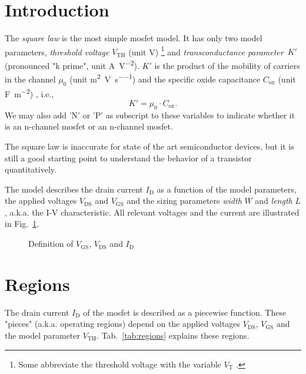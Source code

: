 \documentclass{article}[11pt]
\begin{document}
\notetitle

\section{Introduction}

The \textit{square law} is the most simple \gls{mosfet} model.
It has only two model parameters,
\textit{threshold voltage} $V_{\mathrm{TH}}$ (unit \si{\volt})%
\footnote{Some abbreviate the threshold voltage with 
the variable $V_{\mathrm{T}}$ \cite{allen-cmosancirdes-12,gray-anadesic-09}.}
and 
\textit{transconductance parameter}~$K'$ 
(pronounced "k prime", unit \si{\ampere\per\volt\squared}).
$K'$ is the product of the mobility of carriers in the channel $\mu_0$ 
(unit \si{\meter\squared\per\volt\per\second}) and the 
specific oxide capacitance $C_{\mathrm{ox}}$ 
(unit \si{\farad\per\meter\squared}) \cite{allen-cmosancirdes-12}, i.e.,
\begin{equation}
K' = \mu_0 \cdot C_{\mathrm{ox}}.
\end{equation}
We may also add 'N' or 'P' as subscript to these variables to indicate whether 
it is an n-channel \gls{mosfet} or an n-channel \gls{mosfet}.

The square law is inaccurate for state of the art semiconductor devices, 
but it is still a good starting point to understand the behavior of 
a transistor quantitatively.

\medskip

The model describes the drain current $I_{\mathrm{D}}$ as
a function of the model parameters, the applied voltages
$V_{\mathrm{DS}}$ and $V_{\mathrm{GS}}$ and the sizing
parameters \textit{width} $W$ and \textit{length} $L$, 
a.k.a. the I-V characteristic.
All relevant voltages and the current are illustrated in 
Fig.~\ref{fig:squarelawschematic}.

\begin{figure}[H]
  \centering
  \begin{circuitikz}
    
  \end{circuitikz}
  \caption{Definition of $V_{\mathrm{GS}}$, $V_{\mathrm{DS}}$ and $I_{\mathrm{D}}$}
  \label{fig:squarelawschematic}
\end{figure}


\section{Regions}

The drain current $I_{\mathrm{D}}$ of the \gls{mosfet} is described as a 
piecewise function.
These "pieces" (a.k.a. operating regions) depend on the applied voltages 
$V_{\mathrm{DS}}$, $V_{\mathrm{GS}}$ and the model parameter 
$V_{\mathrm{TH}}$.
Tab.~\ref{tab:regions} explains these regions. 
\end{document}
